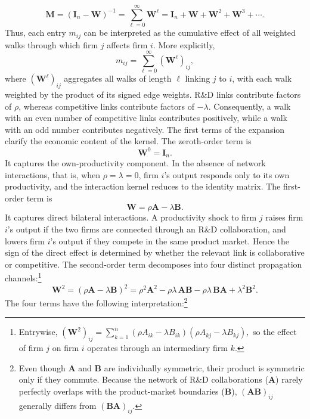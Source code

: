 \begin{equation}
\mathbf{M}
=
(\mathbf{I}_n-\mathbf{W})^{-1}
=
\sum_{\ell=0}^{\infty}\mathbf{W}^{\ell}
=
\mathbf{I}_n+\mathbf{W}+\mathbf{W}^2+\mathbf{W}^3+\cdots .
\label{eq:neumann-kernel}
\end{equation}
Thus, each entry $m_{ij}$ can be interpreted as the cumulative effect of all
weighted walks through which firm $j$ affects firm $i$. More explicitly,
\[
m_{ij}
=
\sum_{\ell=0}^{\infty}(\mathbf{W}^{\ell})_{ij},
\]
where $(\mathbf{W}^{\ell})_{ij}$ aggregates all walks of length $\ell$ linking
$j$ to $i$, with each walk weighted by the product of its signed edge weights.
R\&D links contribute factors of $\rho$, whereas competitive links contribute
factors of $-\lambda$. Consequently, a walk with an even number of competitive
links contributes positively, while a walk with an odd number contributes
negatively. The first terms of the expansion clarify the economic content of
the kernel. The zeroth-order term is
\[
\mathbf{W}^0=\mathbf{I}_n .
\]
It captures the own-productivity component. In the absence of network
interactions, that is, when $\rho=\lambda=0$, firm $i$'s output responds only
to its own productivity, and the interaction kernel reduces to the identity
matrix. The first-order term is
\[
\mathbf{W}
=
\rho \mathbf{A}-\lambda \mathbf{B}.
\]
It captures direct bilateral interactions. A productivity shock to firm $j$
raises firm $i$'s output if the two firms are connected through an R\&D
collaboration, and lowers firm $i$'s output if they compete in the same product
market. Hence the sign of the direct effect is determined by whether the
relevant link is collaborative or competitive. The second-order term decomposes
into four distinct propagation channels:\footnote{Entrywise,
$
(\mathbf{W}^2)_{ij}
=
\sum_{k=1}^n
(\rho A_{ik}-\lambda B_{ik})
(\rho A_{kj}-\lambda B_{kj}),
$
so the effect of firm $j$ on firm $i$ operates through an intermediary firm
$k$.}
\begin{equation}
\mathbf{W}^2
=
(\rho \mathbf{A}-\lambda \mathbf{B})^2
=
\rho^2\mathbf{A}^2
-
\rho\lambda\,\mathbf{A}\mathbf{B}
-
\rho\lambda\,\mathbf{B}\mathbf{A}
+
\lambda^2\mathbf{B}^2 .
\label{eq:second-order-kernel}
\end{equation}
The four terms have the following interpretation:\footnote{Even though
$\mathbf{A}$ and $\mathbf{B}$ are individually symmetric, their product is
symmetric only if they commute. Because the network of R\&D collaborations
($\mathbf{A}$) rarely perfectly overlaps with the product-market boundaries
($\mathbf{B}$), $(\mathbf{A}\mathbf{B})_{ij}$ generally differs from
$(\mathbf{B}\mathbf{A})_{ij}$.}
